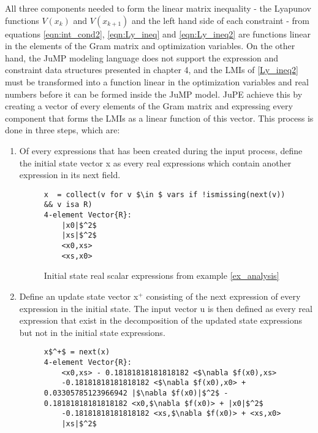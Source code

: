 All three components needed to form the linear matrix inequality - the Lyapunov functions $V(x_k)$ and $V(x_{k+1})$ and the left hand side of each constraint - from equations \ref{eqn:int_cond2}, \ref{eqn:Ly_ineq} and \ref{eqn:Ly_ineq2} are functions linear in the elements of the Gram matrix and optimization variables. On the other hand, the JuMP modeling language does not support the expression and constraint data structures presented in chapter 4, and the LMIs of \ref{Ly_ineq2} must be transformed into a function linear in the optimization variables and real numbers before it can be formed inside the JuMP model. JuPE achieve this by creating a vector of every elements of the Gram matrix and expressing every component that forms the LMIs as a linear function of this vector. This process is done in three steps, which are:
\begin{enumerate}
    \item Of every expressions that has been created during the input process, define the initial state vector x as every real expressions which contain another expression in its next field.
\begin{figure}[h!]
    \begin{lstlisting}[mathescape]
x  = collect(v for v $\in $ vars if !ismissing(next(v)) && v isa R)
4-element Vector{R}:
    |x0|$^2$
    |xs|$^2$
    <x0,xs>
    <xs,x0>
\end{lstlisting}
\caption{Initial state real scalar expressions from example \ref{ex_analysis}}
\label{ex_initstate}
\end{figure}

    \item Define an update state vector x$^+$ consisting of the next expression of every expression in the initial state. The input vector u is then defined as every real expression that exist in the decomposition of the updated state expressions but not in the initial state expressions.
    \begin{figure}[h!]
        \begin{lstlisting}[mathescape]    
x$^+$ = next(x)
4-element Vector{R}:
    <x0,xs> - 0.18181818181818182 <$\nabla $f(x0),xs>
    -0.18181818181818182 <$\nabla $f(x0),x0> + 0.03305785123966942 |$\nabla $f(x0)|$^2$ - 0.18181818181818182 <x0,$\nabla $f(x0)> + |x0|$^2$
    -0.18181818181818182 <xs,$\nabla $f(x0)> + <xs,x0>
    |xs|$^2$


\end{lstlisting}
\end{figure}
\end{enumerate}
